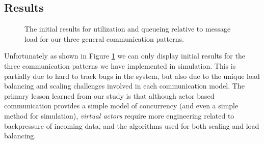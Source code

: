 \documentclass[draftclsnofoot,onecolumn,conference,11pt]{IEEEtran}
\begin{document}
\subsection{Results}

\begin{figure}[!t]
    \centering
    \hfil
    \hfil
    \caption{The initial results for utilization and queueing relative to message load for our three general communication patterns.}
    \label{fig:communications_patterns_simulations}
\end{figure}

Unfortunately as shown in Figure \ref{fig:communications_patterns_simulations} we can only display initial results for the three communication patterns we have implemented in simulation. This is partially due to hard to track bugs in the system, but also due to the unique load balancing and scaling challenges involved in each communication model. The primary lesson learned from our study is that although actor based communication provides a simple model of concurrency (and even a simple method for simulation), \textit{virtual actors} require more engineering related to backpressure of incoming data, and the algorithms used for both scaling and load balancing.
\end{document}
